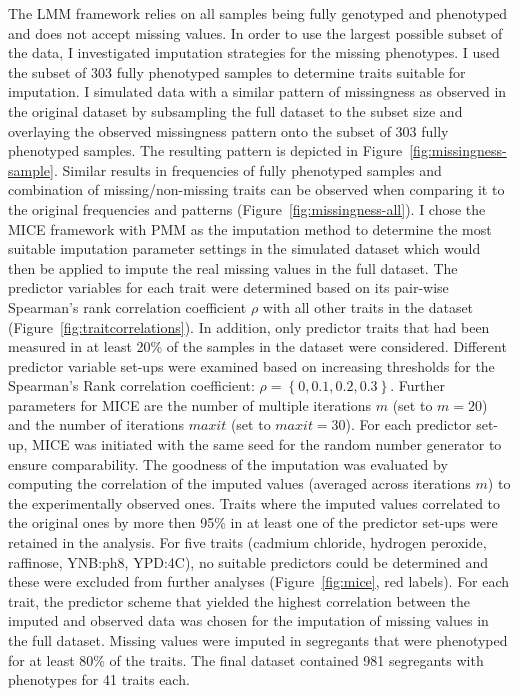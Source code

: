 The LMM framework relies on all samples being fully genotyped and phenotyped and does not accept missing values. In order to use the largest possible subset of the data, I investigated imputation strategies for the missing phenotypes. I used the subset of 303 fully phenotyped samples to determine traits suitable for imputation. I simulated data with a similar pattern of missingness as observed in the original dataset by subsampling the full dataset to the subset size and overlaying the observed missingness pattern onto the subset of 303 fully phenotyped samples. The resulting pattern is depicted in Figure~\ref{fig:missingness-sample}. Similar results in frequencies of fully phenotyped samples and combination of missing/non-missing traits can be observed when comparing it to the original frequencies and patterns (Figure~\ref{fig:missingness-all}). I chose the MICE framework \citep{vanBuuren2011} with PMM as the imputation method to determine the most suitable imputation parameter settings in the simulated dataset which would then be applied to impute the real missing values in the full dataset. The predictor variables for each trait were determined based on its pair-wise Spearman's rank correlation coefficient \(\rho\) with all other traits in the dataset (Figure~\ref{fig:traitcorrelations}). In addition, only predictor traits that had been measured in at least 20\% of the samples in the dataset were considered. Different predictor variable set-ups were examined based on increasing thresholds for the Spearman's Rank correlation coefficient: \(\rho =\left\{0, 0.1, 0.2, 0.3\right\}\). Further parameters for MICE are the number of multiple iterations \(m\) (set to \(m=20\)) and the number of iterations \(maxit\) (set to \(maxit=30\)). For each predictor set-up, MICE was initiated with the same seed for the random number generator to ensure comparability. The goodness of the imputation was evaluated by computing the correlation of the imputed values (averaged across iterations \(m\)) to the experimentally observed ones. Traits where the imputed values correlated to the original ones by more then 95\% in at least one of the predictor set-ups were retained in the analysis. For five traits (cadmium chloride, hydrogen peroxide, raffinose, YNB:ph8, YPD:4C), no suitable predictors could be determined and these were excluded from further analyses (Figure~\ref{fig:mice}, red labels). For each trait, the predictor scheme that yielded the highest correlation between the imputed and observed data was chosen for the imputation of missing values in the full dataset. Missing values were imputed in segregants that were phenotyped for at least 80\% of the traits. The final dataset contained 981 segregants with phenotypes for 41 traits each. 

